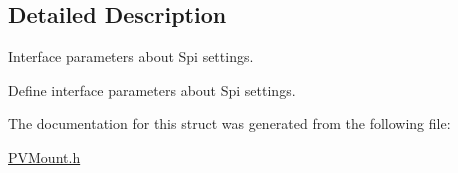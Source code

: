 \subsection{Detailed Description}
Interface parameters about Spi settings. 

Define interface parameters about Spi settings. 

The documentation for this struct was generated from the following file\+:\begin{DoxyCompactItemize}
\item 
\hyperlink{_p_v_mount_8h}{P\+V\+Mount.\+h}\end{DoxyCompactItemize}
